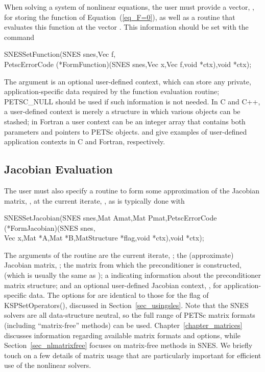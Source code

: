 When solving a system of nonlinear equations, the user must provide
a vector, , for storing the function of
Equation~(\ref{eq_F=0}), as well as a routine that evaluates this
function at the vector .  This information should be set with
the command
\begin{tabbing}
  SNESSetFunction(SNES snes,Vec f,\\
          PetscErrorCode (*FormFunction)(SNES snes,Vec x,Vec f,void *ctx),void *ctx);
\end{tabbing}
The argument  is an optional user-defined context, which can
store any private, application-specific data required by the
function evaluation routine; PETSC\_NULL should be used if such information
is not needed.  In C and C++, a user-defined context is merely a
structure in which various objects can be stashed; in Fortran a user
context can be an integer array that contains both parameters and
pointers to PETSc objects.  and
 give examples of user-defined
application contexts in C and Fortran, respectively.

\subsection{Jacobian Evaluation}
\label{sec_snesjacobian}

The user must also specify a routine to form some approximation of the
Jacobian matrix, , at the current iterate, ,
as is typically done with
\begin{tabbing}
  SNESSetJacobian(SNES snes,Mat Amat,Mat Pmat,PetscErrorCode (*FormJacobian)(SNES snes,\\
          Vec x,Mat *A,Mat *B,MatStructure *flag,void *ctx),void *ctx);
\end{tabbing}
The arguments of the routine  are the current iterate, ; the (approximate) Jacobian matrix,
; the matrix from which the preconditioner is constructed,  (which is usually the same
as ); a  indicating information about the
preconditioner matrix structure; and an optional user-defined Jacobian
context, , for application-specific data.  The options for
 are identical to those for the flag of KSPSetOperators(), discussed in Section~\ref{sec_usingsles}.
Note that the SNES solvers are all data-structure neutral, so the full
range of PETSc matrix formats (including ``matrix-free''
methods) can be used.  Chapter~\ref{chapter_matrices} discusses
information regarding available matrix formats and options, while
Section~\ref{sec_nlmatrixfree} focuses on matrix-free
methods in SNES. We briefly touch on a few details of matrix usage that are
particularly important for efficient use of the nonlinear solvers.

